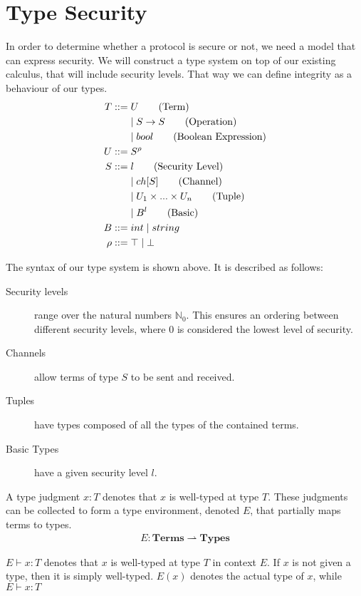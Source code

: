 \section{Type Security}\label{ch:type-security}
In order to determine whether a protocol is secure or not, we need a model that can express security.
We will construct a type system on top of our existing calculus, that will include security levels.
That way we can define integrity as a behaviour of our types.
\begin{align*}
	T::=&\;U \tag{Term}\\
	&\mid S\rightarrow S \tag{Operation}\\
	&\mid bool \tag{Boolean Expression}\\
	U::=&\;S^\rho\\
	S::=&\;l \tag{Security Level}\\
	&\mid ch[S] \tag{Channel}\\
	&\mid U_1 \times...\times U_n \tag{Tuple}\\
	&\mid B^l \tag{Basic}\\
	B::=&\;int 
	\mid string\\
	\rho::=&\;\top\mid\bot\\
\end{align*}

\noindent The syntax of our type system is shown above. It is described as follows:

\begin{description}
\item[Security levels] range over the natural numbers $\mathbb{N}_0$. This ensures an ordering between different security levels, where $0$ is considered the lowest level of security.
\item[Channels] allow terms of type $S$ to be sent and received.
\item[Tuples] have types composed of all the types of the contained terms.
\item[Basic Types] have a given security level $l$.
\end{description}

\noindent A type judgment $x:T$ denotes that $x$ is well-typed at type $T$.
These judgments can be collected to form a type environment, denoted $E$, that partially maps terms to types.
\begin{align*}
E: \mathbf{Terms} \rightharpoonup \mathbf{Types}
\end{align*}

\noindent $E\vdash x:T$ denotes that $x$ is well-typed at type $T$ in context $E$.
If $x$ is not given a type, then it is simply well-typed. $E(x)$ denotes the actual type of $x$, while $E\vdash x:T$ 

